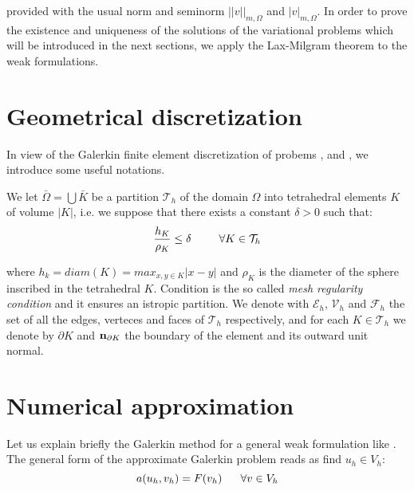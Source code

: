 provided with the usual norm and seminorm $|| v ||_{m,\Omega}$ and $|v|_{m,\Omega}$.
In order to prove the existence and uniqueness of the solutions of the variational problems which will be introduced in the next sections, we apply the Lax-Milgram theorem \cite{salsa:EDP} to the weak formulations.





\section{Geometrical discretization}

In view of the Galerkin finite element discretization of probems ,  and , we introduce some useful notations.

We let $\bar{\Omega} =  \bigcup \bar{K}$ be a partition $\mathcal{T}_h$ of the domain $\Omega$ into tetrahedral elements $K$ of volume $|K|$, i.e. we suppose that there exists a constant $\delta>0$ such that:
\begin{equation}
\label{eq: mesh regular condition}
\dfrac{h_K}{\rho_K} \leq \delta \psp{15} \forall K \in \mathcal{T}_h
\end{equation}

where $h_k=diam(K)=max_{x,y\in K}|x-y|$ and $\rho_K$ is the diameter of the sphere inscribed in the tetrahedral $K$. Condition  is the so called \textit{mesh regularity condition} \cite{quarteroni:modnum} and it ensures an istropic partition.
We denote with $\mathcal{E}_h$, $\mathcal{V}_h$ and $\mathcal{F}_h$ the set of all the edges, verteces and faces  
of $\mathcal{T}_h$ respectively, and for each $K\in \mathcal{T}_h$ we denote by $\partial K$ and $\mathbf{n}_{\partial K}$ the boundary of the element and its outward unit normal.
  
\section{Numerical approximation}

Let us explain briefly the Galerkin method for a general weak formulation like . The general form of the approximate Galerkin problem reads as find $u_h\in V_h$:
\begin{equation}
\label{eq: general galerkin problem}
a(u_h,v_h) = F(v_h) \psp{10} \forall v \in V_h
\end{equation}



